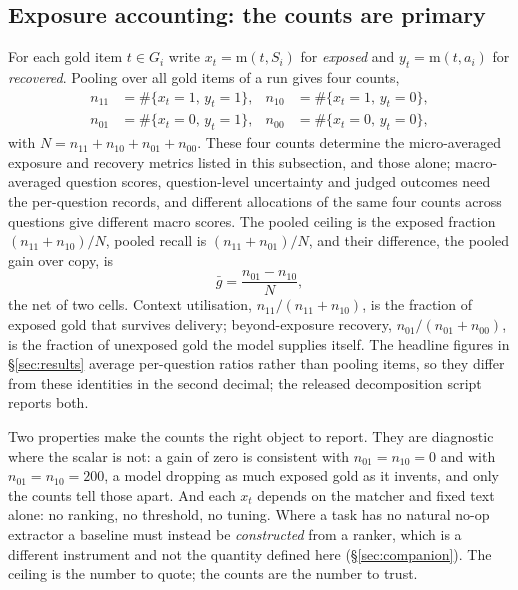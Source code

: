 \documentclass[10pt,twocolumn]{article}
\begin{document}
\subsection{Exposure accounting: the counts are primary}\label{sec:accounting}
For each gold item $t\in G_i$ write $x_t=\mathrm{m}(t,S_i)$ for \emph{exposed} and $y_t=\mathrm{m}(t,a_i)$ for \emph{recovered}. Pooling over all gold items of a run gives four counts,
\[
\begin{aligned}
  n_{11}&=\#\{x_t{=}1,\,y_t{=}1\}, & n_{10}&=\#\{x_t{=}1,\,y_t{=}0\},\\
  n_{01}&=\#\{x_t{=}0,\,y_t{=}1\}, & n_{00}&=\#\{x_t{=}0,\,y_t{=}0\},
\end{aligned}
\]
with $N=n_{11}+n_{10}+n_{01}+n_{00}$. These four counts determine the micro-averaged exposure and recovery metrics listed in this subsection, and those alone; macro-averaged question scores, question-level uncertainty and judged outcomes need the per-question records, and different allocations of the same four counts across questions give different macro scores. The pooled ceiling is the exposed fraction $(n_{11}+n_{10})/N$, pooled recall is $(n_{11}+n_{01})/N$, and their difference, the pooled gain over copy, is
\[
  \bar g=\frac{n_{01}-n_{10}}{N},
\]
the net of two cells. Context utilisation, $n_{11}/(n_{11}+n_{10})$, is the fraction of exposed gold that survives delivery; beyond-exposure recovery, $n_{01}/(n_{01}+n_{00})$, is the fraction of unexposed gold the model supplies itself. The headline figures in \S\ref{sec:results} average per-question ratios rather than pooling items, so they differ from these identities in the second decimal; the released decomposition script reports both.

Two properties make the counts the right object to report. They are diagnostic where the scalar is not: a gain of zero is consistent with $n_{01}=n_{10}=0$ and with $n_{01}=n_{10}=200$, a model dropping as much exposed gold as it invents, and only the counts tell those apart. And each $x_t$ depends on the matcher and fixed text alone: no ranking, no threshold, no tuning. Where a task has no natural no-op extractor a baseline must instead be \emph{constructed} from a ranker, which is a different instrument and not the quantity defined here (\S\ref{sec:companion}). The ceiling is the number to quote; the counts are the number to trust.
\end{document}
